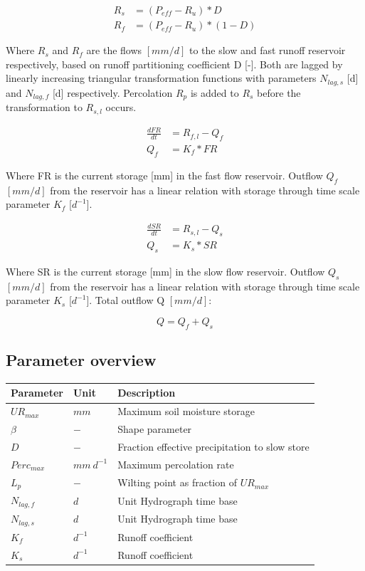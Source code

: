\begin{align}
	R_s &= (P_{eff} - R_u)*D\\
	R_f &= (P_{eff} - R_u)*(1-D)
\end{align}

Where $R_s$ and $R_f$ are the flows $[mm/d]$ to the slow and fast runoff reservoir respectively, based on runoff partitioning coefficient D [-]. Both are lagged by linearly increasing triangular transformation functions with parameters $N_{lag,s}$ [d] and $N_{lag,f}$ [d] respectively. Percolation $R_p$ is added to $R_s$ before the transformation to $R_{s,l}$ occurs.

\begin{align}
	\frac{dFR}{dt} &= R_{f,l} - Q_f\\
	Q_f &= K_f * FR 
\end{align}

Where FR is the current storage [mm] in the fast flow reservoir. Outflow $Q_f$ $[mm/d]$ from the reservoir has a linear relation with storage through time scale parameter $K_f$ [$d^{-1}$]. 

\begin{align}
	\frac{dSR}{dt} &= R_{s,l} - Q_s \\
	Q_s &= K_s * SR 
\end{align}

Where SR is the current storage [mm] in the slow flow reservoir. Outflow $Q_s$ $[mm/d]$ from the reservoir has a linear relation with storage through time scale parameter $K_s$ [$d^{-1}$]. Total outflow Q  $[mm/d]$:

\begin{equation}
	Q = Q_f + Q_s
\end{equation}

\subsection{Parameter overview}
\begin{table}[htbp]
  \centering
    \begin{tabular}{lll}
    \toprule
    Parameter & Unit  & Description \\
    \midrule
    $UR_{max}$ & $mm$  & Maximum soil moisture storage \\
    $\beta$ & $-$   & Shape parameter \\
    $D$   & $-$   & Fraction effective precipitation to slow store \\
    $Perc_{max}$ & $mm~d^{-1}$ & Maximum percolation rate \\
    $L_p$ & $-$   & Wilting point as fraction of $UR_{max}$ \\
    $N_{lag,f}$ & $d$   & Unit Hydrograph time base \\
    $N_{lag,s}$ & $d$   & Unit Hydrograph time base \\
    $K_f$ & $d^{-1}$ & Runoff coefficient \\
    $K_s$ & $d^{-1}$ & Runoff coefficient \\
    \bottomrule
    \end{tabular}%
  \label{tab:addlabel}%
\end{table}%
